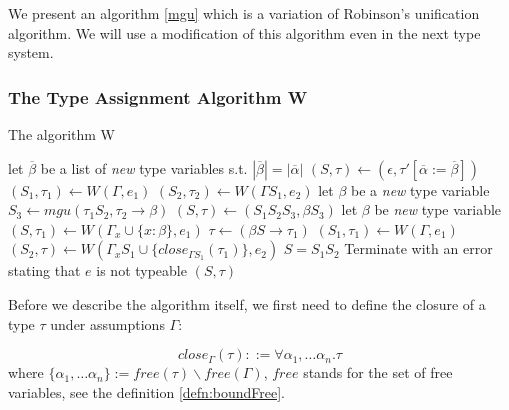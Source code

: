 We present an algorithm \ref{mgu} which is a variation of Robinson's unification algorithm. We will use a modification of this algorithm even in the next type system.

\subsubsection{The Type Assignment Algorithm W}

\begin{algorithm}[t]
\caption{The algorithm W \cite{milner1978theory}}
\label{w}
\begin{algorithmic}[1]
    \State let $\overline{\beta}$ be a list of \emph{new} type variables s.t. $|\overline{\beta}| = |\overline{\alpha}|$
    \State $(S, \tau) \gets (\epsilon, \tau' [\overline{\alpha} := \overline{\beta}])$
    \State $(S_1, \tau_1) \gets W(\Gamma, e_1)$
    \State $(S_2, \tau_2) \gets W(\Gamma S_1, e_2)$
    \State let $\beta$ be a \emph{new} type variable
    \State $S_3 \gets mgu (\tau_1 S_2, \tau_2 \rightarrow \beta)$
    \State $(S, \tau) \gets (S_1 S_2 S_3, \beta S_3)$
    \State let $\beta$ be \emph{new} type variable
    \State $(S, \tau_1) \gets W(\Gamma_x \cup \{x : \beta\}, e_1)$
    \State $\tau \gets (\beta S \rightarrow \tau_1)$
    \State $(S_1, \tau_1) \gets W(\Gamma, e_1)$
    \State $(S_2, \tau) \gets W(\Gamma_x S_1 \cup \{close_{\Gamma S_1}(\tau_1)\}, e_2)$
    \State $S = S_1 S_2$
    \Else
    \State Terminate with an error stating that $e$ is not typeable
    \EndIf
    \State \Return $(S, \tau)$
\EndFunction
\end{algorithmic}
\end{algorithm}

Before we describe the algorithm itself, we first need to define the closure of a type $\tau$ under assumptions $\Gamma$:

\begin{defn}
    \label{defn:close}
    $$close_\Gamma(\tau) ::= \forall \alpha_1, \dots \alpha_n . \tau$$
    where $\{\alpha_1, \dots \alpha_n\} := free(\tau) \backslash free(\Gamma)$, $free$ stands for the set of free variables, see the definition \ref{defn:boundFree}.
\end{defn}


